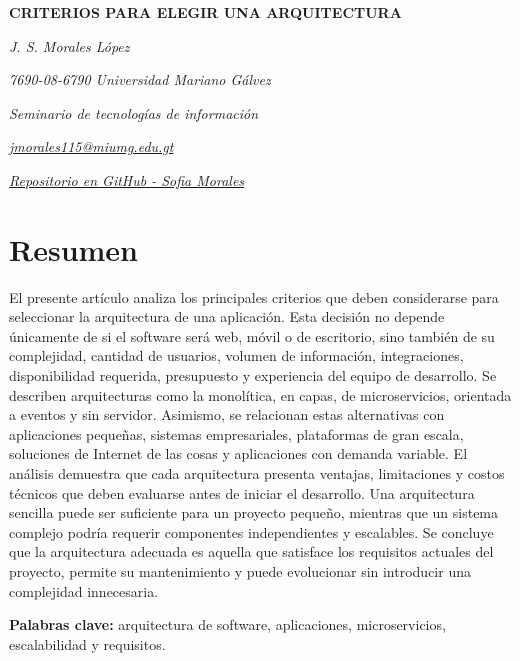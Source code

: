 \documentclass[12pt]{article}
\author{Jenny Sofía Morales}
\begin{document}
	
	\begin{center}
		
		{\bfseries\fontsize{12}{14}\selectfont
			CRITERIOS PARA ELEGIR UNA ARQUITECTURA
		}
		
		\vspace{0.4cm}
		
		{\itshape J. S. Morales López}
		
		\vspace{0.2cm}
		
		{\itshape 7690-08-6790 Universidad Mariano Gálvez}
		
		{\itshape Seminario de tecnologías de información}
		
		{\itshape
			\href{mailto:jmorales115@miumg.edu.gt}
			{jmorales115@miumg.edu.gt}
		}
		
		{\itshape 
			\href{https://github.com/sofiaMorales3805/ForoAcademico-Seminario}
			{Repositorio en GitHub - Sofia Morales}
		}
	\end{center}
	
	\vspace{0.5cm}
	\section*{Resumen}
	
	El presente artículo analiza los principales criterios que deben considerarse
	para seleccionar la arquitectura de una aplicación. Esta decisión no depende
	únicamente de si el software será web, móvil o de escritorio, sino también de
	su complejidad, cantidad de usuarios, volumen de información, integraciones,
	disponibilidad requerida, presupuesto y experiencia del equipo de desarrollo.
	Se describen arquitecturas como la monolítica, en capas, de microservicios,
	orientada a eventos y sin servidor. Asimismo, se relacionan estas alternativas
	con aplicaciones pequeñas, sistemas empresariales, plataformas de gran escala,
	soluciones de Internet de las cosas y aplicaciones con demanda variable. El
	análisis demuestra que cada arquitectura presenta ventajas, limitaciones y
	costos técnicos que deben evaluarse antes de iniciar el desarrollo. Una
	arquitectura sencilla puede ser suficiente para un proyecto pequeño, mientras
	que un sistema complejo podría requerir componentes independientes y
	escalables. Se concluye que la arquitectura adecuada es aquella que satisface
	los requisitos actuales del proyecto, permite su mantenimiento y puede
	evolucionar sin introducir una complejidad innecesaria.
	
	\noindent
	\textbf{Palabras clave:} arquitectura de software, aplicaciones, microservicios, escalabilidad y requisitos.
	
\end{document}
